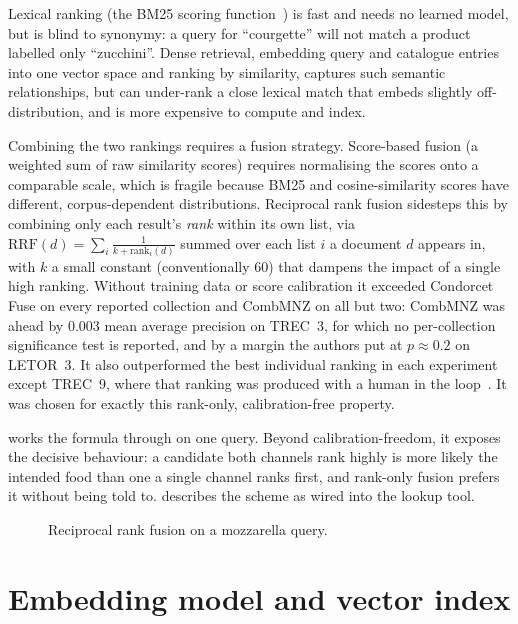 Lexical ranking (the BM25 scoring function~\cite{robertson2009probabilistic}) is fast and needs no learned model, but is blind to synonymy: a query for \enquote{courgette} will not match a product labelled only \enquote{zucchini}. Dense retrieval, embedding query and catalogue entries into one vector space and ranking by similarity, captures such semantic relationships, but can under-rank a close lexical match that embeds slightly off-distribution, and is more expensive to compute and index.

Combining the two rankings requires a fusion strategy. Score-based fusion (a weighted sum of raw similarity scores) requires normalising the scores onto a comparable scale, which is fragile because BM25 and cosine-similarity scores have different, corpus-dependent distributions. Reciprocal rank fusion sidesteps this by combining only each result's \emph{rank} within its own list, via $\mathrm{RRF}(d) = \sum_i \frac{1}{k + \mathrm{rank}_i(d)}$ summed over each list $i$ a document $d$ appears in, with $k$ a small constant (conventionally \num{60}) that dampens the impact of a single high ranking. Without training data or score calibration it exceeded Condorcet Fuse on every reported collection and CombMNZ on all but two: CombMNZ was ahead by \num{0.003} mean average precision on TREC~3, for which no per-collection significance test is reported, and by a margin the authors put at $p \approx \num{0.2}$ on LETOR~3. It also outperformed the best individual ranking in each experiment except TREC~9, where that ranking was produced with a human in the loop~\cite{cormack2009reciprocal}. It was chosen for exactly this rank-only, calibration-free property.

 works the formula through on one query. Beyond calibration-freedom, it exposes the decisive behaviour: a candidate both channels rank highly is more likely the intended food than one a single channel ranks first, and rank-only fusion prefers it without being told to.  describes the scheme as wired into the lookup tool.

\begin{figure}[htbp]
    \centering
    \resizebox{0.92\textwidth}{!}{}
    \caption{Reciprocal rank fusion on a mozzarella query.}
    \label{fig:diagram-rrf-example}
\end{figure}

\section{Embedding model and vector index}
\label{sec:tools-embeddings}


